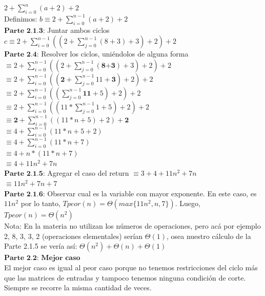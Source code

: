 \documentclass[10pt,a4paper]{article}
\begin{document}
$ 2 + \sum_{i=0}^{n}{(a+2)} + 2 $ \\ 
Definimos:  $b \equiv 2 + \sum_{i=0}^{n-1}{(a+2)} + 2 $ \\
$\textbf{Parte 2.1.3}$: Juntar ambos ciclos
$c \equiv 2 + \sum_{i=0}^{n-1}{((2 + \sum_{j=0}^{n-1}{(8+3)} + 3)+2)} + 2 $ \\ 
$\textbf{Parte 2.4}$: Resolver los ciclos, uniéndolos de alguna forma \\
$\equiv 2 + \sum_{i=0}^{n-1}{((2 + \sum_{j=0}^{n-1}{(\textbf{8+3})} + 3)+2)} + 2 $ \\ 
$\equiv 2 + \sum_{i=0}^{n-1}{((\textbf{2} + \sum_{j=0}^{n-1}{11} + \textbf{3})+2)} + 2 $ \\ 
$\equiv 2 + \sum_{i=0}^{n-1}{((\sum_{j=0}^{n-1}{\textbf{11}} + 5)+2)} + 2 $ \\ 
$\equiv 2 + \sum_{i=0}^{n-1}{((11 * \sum_{j=0}^{n-1}{1} + 5)+2)} + 2 $ \\
$\equiv \textbf{2} + \sum_{i=0}^{n-1}{((11 * n + 5)+2)} + \textbf{2} $ \\  
$\equiv 4 + \sum_{i=0}^{n-1}{(11 * n + 5+2)} $ \\  
$\equiv 4 + \sum_{i=0}^{n-1}{(11 * n + 7)} $ \\
$\equiv 4 + n * (11 * n + 7) $ \\    
$\equiv 4 + 11n^{2} + 7n $ \\   
$\textbf{Parte 2.1.5}$: Agregar el caso del return 
$\equiv 3 + 4 + 11n^{2} + 7n $ \\   
$\equiv 11n^{2} + 7n + 7 $ \\
$\textbf{Parte 2.1.6}$: Observar cual es la variable con mayor exponente.
En este caso, es $11n^{2}$ por lo tanto, $T{peor}(n) = \Theta(max\{11n^{2}, n, 7\})$. Luego,  
$T{peor}(n) = \Theta(n^{2})$ \\ 
Nota: En la materia no utilizan los números de operaciones, pero acá por ejemplo 2, 8, 3, 3, 2 (operaciones elementales) serían $\Theta(1)$, osea nuestro cálculo de la Parte 2.1.5 se vería así: $\Theta(n^{2}) + \Theta(n) + \Theta(1)$ \\ 
$\textbf{Parte 2.2: Mejor caso}$ \\ 
El mejor caso es igual al peor caso porque no tenemos restricciones del ciclo más que las matrices de entradas y tampoco tenemos ninguna condición de corte. Siempre se recorre la misma cantidad de veces.
\end{document}
